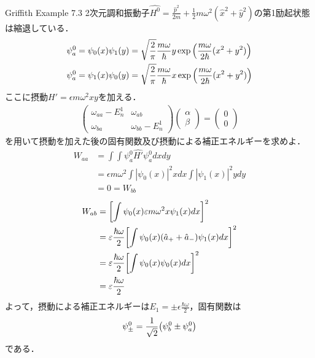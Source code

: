 \documentclass{report}
\begin{document}
  \begin{myexc}{Griffith Example 7.3}{}
    2次元調和振動子$\hat{H^0}=\frac{\hat{p}^2}{2m}+\frac{1}{2}m\omega^2(\hat{x}^2+\hat{y}^2)$の第1励起状態は縮退している．
    \begin{align}
      \psi^0_a&=\psi_0(x)\psi_1(y)=\sqrt{\frac{2}{\pi}}\frac{m\omega}{\hbar}y\exp\qty(\frac{m\omega}{2\hbar}(x^2+y^2))\\
      \psi^0_a&=\psi_1(x)\psi_0(y)=\sqrt{\frac{2}{\pi}}\frac{m\omega}{\hbar}x\exp\qty(\frac{m\omega}{2\hbar}(x^2+y^2))
    \end{align}
    ここに摂動$\hat{H'}=\epsilon m\omega^2xy$を加える．
    \begin{align}
      \begin{pmatrix}
        \omega_{aa}-E_n^1&\omega_{ab}\\
        \omega_{ba}&\omega_{bb}-E_n^1
      \end{pmatrix}
      \begin{pmatrix}
        \alpha\\
        \beta
      \end{pmatrix}
      =
      \begin{pmatrix}
        0\\0
      \end{pmatrix}
    \end{align}
    を用いて摂動を加えた後の固有関数及び摂動による補正エネルギーを求めよ．
    \tcblower
    \begin{align}
      W_{aa}&=\int\int\psi_a^0\hat{H'}\psi_a^0dxdy\\
      &=\epsilon m\omega^2\int|\psi_0(x)|^2xdx\int|\psi_1(x)|^2ydy\\
      &=0=W_{bb}
    \end{align}
    \begin{align}
      W_{ab}&=\qty[\int\psi_0(x)\varepsilon m\omega^2x\psi_1(x)dx]^2\\
      &=\varepsilon\frac{\hbar\omega}{2}\qty[\int\psi_0(x)(\hat{a}_{+}+\hat{a}_{-})\psi_1(x)dx]^2\\
      &=\varepsilon\frac{\hbar\omega}{2}\qty[\int\psi_0(x)\psi_0(x)dx]^2\\
      &=\varepsilon\frac{\hbar\omega}{2}
    \end{align}
    よって，摂動による補正エネルギーは$E_1=\pm\epsilon\frac{\hbar\omega}{2}$，固有関数は
    \begin{align}
      \psi_{\pm}^0=\frac{1}{\sqrt{2}}\qty(\psi_b^0\pm\psi_a^0)
    \end{align}
    である．
  \end{myexc}
\end{document}
